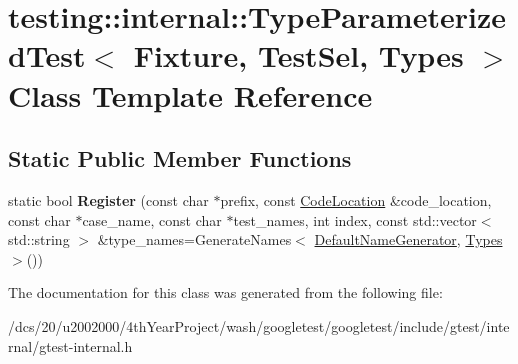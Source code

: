\hypertarget{classtesting_1_1internal_1_1TypeParameterizedTest}{}\section{testing\+:\+:internal\+:\+:Type\+Parameterized\+Test$<$ Fixture, Test\+Sel, Types $>$ Class Template Reference}
\label{classtesting_1_1internal_1_1TypeParameterizedTest}
\subsection*{Static Public Member Functions}
\begin{DoxyCompactItemize}
\item 
\mbox{\label{classtesting_1_1internal_1_1TypeParameterizedTest_af8e2c28505fec218580f962498f21691}} 
static bool {\bfseries Register} (const char $\ast$prefix, const \mbox{\hyperlink{structtesting_1_1internal_1_1CodeLocation}{Code\+Location}} \&code\+\_\+location, const char $\ast$case\+\_\+name, const char $\ast$test\+\_\+names, int index, const std\+::vector$<$ std\+::string $>$ \&type\+\_\+names=Generate\+Names$<$ \mbox{\hyperlink{structtesting_1_1internal_1_1DefaultNameGenerator}{Default\+Name\+Generator}}, \mbox{\hyperlink{structtesting_1_1internal_1_1Types}{Types}} $>$())
\end{DoxyCompactItemize}


The documentation for this class was generated from the following file\+:\begin{DoxyCompactItemize}
\item 
/dcs/20/u2002000/4th\+Year\+Project/wash/googletest/googletest/include/gtest/internal/gtest-\/internal.\+h\end{DoxyCompactItemize}
